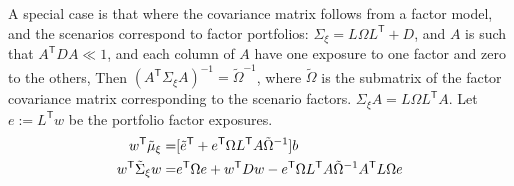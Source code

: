 \documentclass[letter, 12pt]{article}
\newcommand{\transpose}{^\mathsf{T}}
\newcommand{\R}{\mathbb{R}}
\newcommand{\inv}{^{-1}}
\begin{document}
A special case is that where the covariance matrix follows from a factor model, and the scenarios correspond to factor portfolios: $\Sigma_\xi = L\Omega L\transpose +D$, and $A$ is such that  $A \transpose D A\ll 1$, and each column of $A$ have one exposure to one factor and zero to the others, Then $(A\transpose \Sigma_\xi A)\inv=\tilde\Omega\inv$, where $\tilde\Omega$ is the submatrix of the factor covariance matrix corresponding to the scenario factors. $\Sigma_\xi A=L\Omega L\transpose A$. Let $e:=L\transpose w$ be the portfolio factor exposures.
\begin{align}
w\transpose \tilde\mu_\xi = & [\tilde e\transpose  + e\transpose\Omega L\transpose A \tilde\Omega\inv] b\label{eq:cond2a}\\
w\transpose \tilde \Sigma_{\xi} w = &  e\transpose\Omega e +w\transpose Dw - e\transpose\Omega L\transpose A \tilde\Omega\inv  A\transpose L\Omega e \notag
\end{align}
%
%
%
%
%
%
%
%
\end{document}
